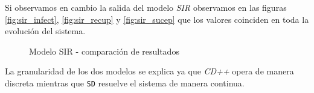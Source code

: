 Si observamos en cambio la salida del modelo \textit{SIR} observamos en las figuras \ref{fig:sir_infect}, \ref{fig:sir_recup} y \ref{fig:sir_sucep} que los valores coinciden en toda la evolución del sistema.

\begin{figure}[H]
    \centering     %
        \caption{Modelo SIR - comparación de resultados}
\end{figure}

La granularidad de los dos modelos se explica ya que \textit{CD++} opera de manera discreta mientras que \texttt{SD} resuelve el sistema de manera continua.
